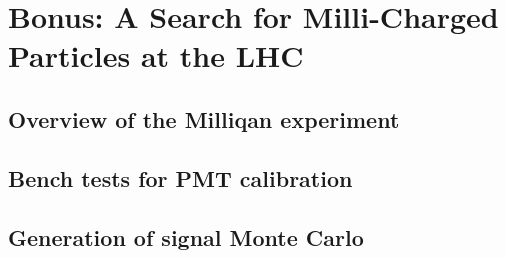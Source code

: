 \chapter{Bonus: A Search for Milli-Charged Particles at the LHC}

\section{Overview of the Milliqan experiment}

\section{Bench tests for PMT calibration}

\section{Generation of signal Monte Carlo}

